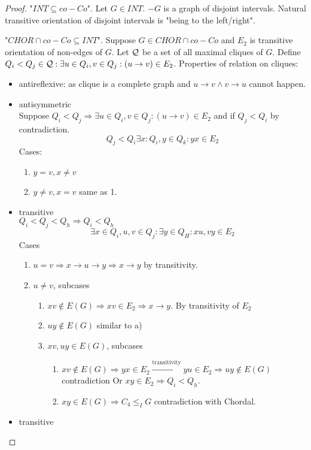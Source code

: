 \begin{proof}
	"$INT \subseteq co-Co$". Let $G \in INT$.
	$-G$ is a graph of disjoint intervals.
	Natural transitive orientation of disjoint intervals is "being to the left/right".

	"$CHOR \cap co-Co \subseteq INT$". Suppose $G \in CHOR \cap co-Co$ and $E_2$ is transitive orientation of non-edges of $G$.
	Let $\operatorname{\mathcal{Q}}$ be a set of all maximal cliques of $G$.
	Define $Q_i < Q_j \in \operatorname{\mathcal{Q}}: \exists u \in Q_i, v \in Q_j: (u \rightarrow v) \in E_2$.
	Properties of relation on cliques:
	\begin{itemize}
		\item antireflexive: as clique is a complete graph and $u\rightarrow v \land v \rightarrow u$ cannot happen.
		\item antisymmetric \\
			Suppose $Q_i < Q_j \Rightarrow \exists u \in Q_i, v \in Q_j: (u \rightarrow v) \in E_2$ and if $Q_j < Q_i$ by contradiction.
			\[ Q_j < Q_i \exists x: Q_i, y \in Q_k: yx \in E_2 \]
			Cases:
			\begin{enumerate}
				\item $y = v, x \ne v$
				\item $y \ne v, x = v$ same as 1.
			\end{enumerate}
		\item transitive\\
			$Q_i < Q_j < Q_h \Rightarrow Q_i < Q_h$
			\[ \exists x \in Q_i, u,v \in Q_j: \exists y \in Q_H : xu,vy \in E_2 \]
			Cases
			\begin{enumerate}
				\item $u = v \Rightarrow x \rightarrow u \rightarrow y \Rightarrow x \rightarrow y$ by transitivity.
				\item $u \ne v$, subcases
					\begin{enumerate}
						\item $xv \notin E(G) \Rightarrow xv \in E_2 \Rightarrow x \rightarrow y$.
							By transitivity of $E_2$
						\item $uy \notin E(G)$ similar to a)
						\item $xv, uy \in E(G)$, subcases
						\begin{enumerate}
							\item $xv \notin E(G) \Rightarrow yx \in E_2 \stackrel{\text{transitivity}}{\rightarrow} yu \in E_2 \Rightarrow uy \notin E(G)$ contradiction
								Or $xy \in E_2 \Rightarrow Q_i < Q_h$.
							\item $xy \in E(G) \Rightarrow C_4 \leq_I G$ contradiction with Chordal.
						\end{enumerate}
					\end{enumerate}
			\end{enumerate}
		\item transitive\\
	\end{itemize}


\end{proof}
